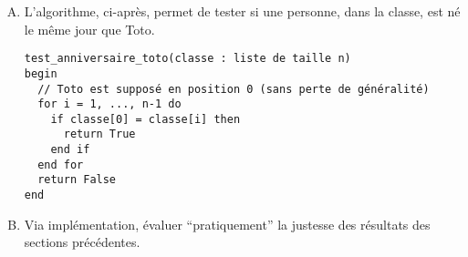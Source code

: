 \begin{enumerate}[(A)]
	\item 
L'algorithme, ci-après, 
permet de
tester si une personne, dans la classe, est né le même jour que Toto.
\begin{Verbatim}
test_anniversaire_toto(classe : liste de taille n)
begin
  // Toto est supposé en position 0 (sans perte de généralité)
  for i = 1, ..., n-1 do
    if classe[0] = classe[i] then 
      return True
    end if
  end for
  return False
end
\end{Verbatim}

\item 
Via implémentation, évaluer ``pratiquement''
la justesse des résultats des sections précédentes.
\end{enumerate}